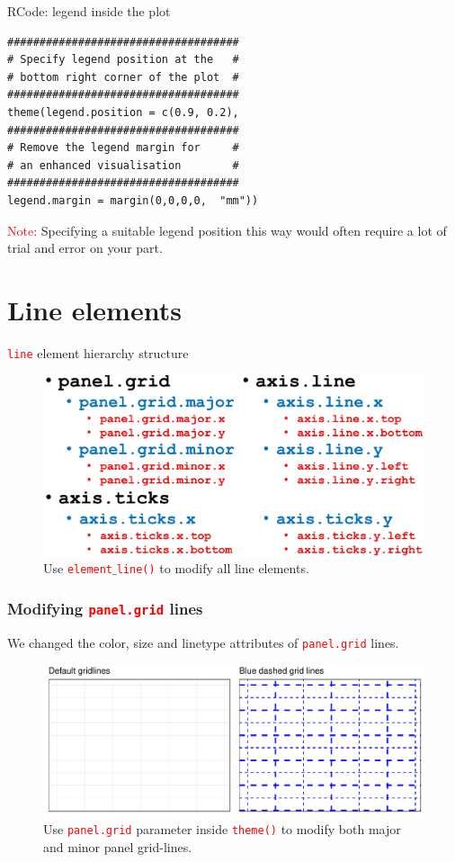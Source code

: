 \documentclass{beamer}
\begin{document}
\begin{frame}[fragile]{RCode: legend inside the plot}
\begin{lstlisting}
####################################
# Specify legend position at the   #
# bottom right corner of the plot  #
####################################
theme(legend.position = c(0.9, 0.2),
####################################
# Remove the legend margin for     #
# an enhanced visualisation        #
####################################
legend.margin = margin(0,0,0,0,  "mm"))
\end{lstlisting}
\textcolor{red}{Note}: Specifying a suitable legend position this way would often require a lot of trial and error on your part.
\end{frame}


\section{Line elements}
\begin{frame}{\texttt{\textcolor{red}{line}} element hierarchy structure}
\begin{figure}
\includegraphics[width=0.99\linewidth]{PlotsLec3/LineThemeElements}
\caption{\small{Use \texttt{\textcolor{red}{element}$\_$\textcolor{red}{line()}} to modify all line elements}.}
\end{figure}
\end{frame}

\begin{frame}\frametitle{Modifying \texttt{\textcolor{red}{panel.grid}} lines}
We changed the color, size and linetype attributes of \texttt{\textcolor{red}{panel.grid}} lines.
\begin{figure}
\includegraphics[width=0.99\linewidth]{PlotsLec3/GridLinePlt}
\caption{\small{Use \texttt{\textcolor{red}{panel.grid}} parameter inside \texttt{\textcolor{red}{theme()}} to modify both major and minor panel grid-lines}.}
\end{figure}
\end{frame}
\end{document}
